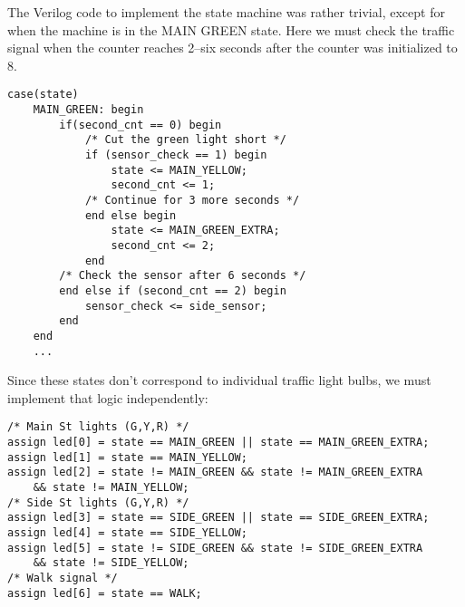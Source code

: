 \documentclass[11pt]{article}
\begin{document}

The Verilog code to implement the state machine was rather trivial, except for when the machine is in the MAIN GREEN state. Here we must check the traffic signal when the counter reaches 2--six seconds after the counter was initialized to 8.

\begin{lstlisting}
case(state)
	MAIN_GREEN: begin
		if(second_cnt == 0) begin
			/* Cut the green light short */
			if (sensor_check == 1) begin 
				state <= MAIN_YELLOW;
				second_cnt <= 1;
			/* Continue for 3 more seconds */
			end else begin 
				state <= MAIN_GREEN_EXTRA;
				second_cnt <= 2;
			end
		/* Check the sensor after 6 seconds */
		end else if (second_cnt == 2) begin
			sensor_check <= side_sensor;
		end 
	end
	...
\end{lstlisting}

Since these states don't correspond to individual traffic light bulbs, we must implement that logic independently:

\begin{lstlisting}
/* Main St lights (G,Y,R) */
assign led[0] = state == MAIN_GREEN || state == MAIN_GREEN_EXTRA;
assign led[1] = state == MAIN_YELLOW;
assign led[2] = state != MAIN_GREEN && state != MAIN_GREEN_EXTRA 
	&& state != MAIN_YELLOW;
/* Side St lights (G,Y,R) */
assign led[3] = state == SIDE_GREEN || state == SIDE_GREEN_EXTRA;
assign led[4] = state == SIDE_YELLOW;
assign led[5] = state != SIDE_GREEN && state != SIDE_GREEN_EXTRA 
	&& state != SIDE_YELLOW;
/* Walk signal */
assign led[6] = state == WALK;
\end{lstlisting}
\end{document}
